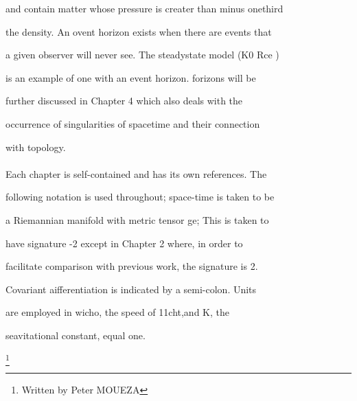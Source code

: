 \documentclass{article}
\date{1st february 1966}
\begin{document}








and contain matter whose pressure is creater than minus onethird

the density. An ovent horizon exists when there are events that

a given observer will never see. The steadystate model (K0 Rce )

is an example of one with an event horizon. forizons will be

further discussed in Chapter 4 which also deals with the

occurrence of singularities of spacetime and their connection

with topology.

\paragraph{}
Each chapter is self-contained and has its own references. The

following notation is used throughout; space-time is taken to be

a Riemannian manifold with metric tensor ge; This is taken to

have signature -2 except in Chapter 2 where, in order to

facilitate comparison with previous work, the signature is 2.

Covariant aifferentiation is indicated by a semi-colon. Units

are employed in wicho, the speed of 11cht,and K, the

seavitational constant, equal one.


\footnote{Written by Peter MOUEZA}
\end{document}

